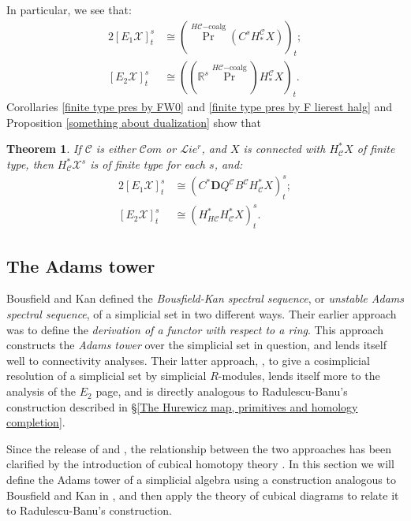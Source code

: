 \documentclass[11pt]{amsart} \renewcommand{\baselinestretch}{1.4}
\theoremstyle{plain}
\newtheorem{thm}{Theorem}[section]
\theoremstyle{definition}
\DeclareMathOperator{\Prim}{Pr}
\newcommand{\scrL}{\mathscr{L}}
\newcommand{\scrC}{\mathscr{C}}
\newcommand{\calx}{\mathcal{X}}
\newcommand{\calc}{\mathcal{C}}
\newcommand{\HA}[1]{H#1}
\newcommand{\HC}[1]{H#1\mathrm{-coalg}}
\newcommand{\algs}{{\scrC\!\textit{om}}}
\newcommand{\restliealgs}{{\scrL\!\textit{ie}^\textit{r}}}
\newcommand{\algcat}{{\calc}}%
\newcommand{\Edownup}[5]{[E_{#1}^{#2}#3]^{#4}_{#5}}
\newcommand{\dual}{\mathbf{D}}
\begin{document}
\begin{Bousfield-Kan spectral sequence}
In particular, we see that:
\begin{alignat*}{2}
\Edownup{1}{}{\calx}{s}{t}&\cong (\Prim^{\HC{\calc}}(C^sH_*^{\algcat}X))_{t};\\
\Edownup{2}{}{\calx}{s}{t}&\cong((\mathbb{R}^s\Prim^{\HC{\calc}})H_*^{\algcat}X)_t.
\end{alignat*}
Corollaries \ref{finite type pres by FW0} and \ref{finite type pres by F lierest halg} and Proposition \ref{something about dualization} show that
\begin{thm}
\label{identify E2 with derived Q}
If $\algcat$ is either $\algs$ or $\restliealgs$, and $X$ is connected with $H^*_\calc X$  of finite type, then $H^*_\calc\calx^s$ is of finite type for each $s$, and:
\begin{alignat*}{2}
\Edownup{1}{}{\calx}{s}{t}&\cong (C^*\dual Q^\algcat B^\algcat H^*_{\algcat}X)^{s}_{t};\\
\Edownup{2}{}{\calx}{s}{t}&\cong (H^*_{\HA{\algcat}}H^*_{\algcat}X)^{s}_{t}.
\end{alignat*}
\end{thm}





\subsection{The Adams tower}\label{sec:derWRTab}\label{sec:relnWithRB}
Bousfield and Kan defined the \emph{Bousfield-Kan spectral sequence}, or \emph{unstable Adams spectral sequence}, of a simplicial set in two different ways. Their earlier approach \cite{BK_pairings.pdf} was to define the \emph{derivation of a functor with respect to a ring}. This approach constructs the \emph{Adams tower} over the simplicial set in question, and lends itself well to connectivity analyses. Their latter approach, \cite{BousKanSSeq.pdf}, to give a cosimplicial resolution of a simplicial set by simplicial $R$-modules, lends itself more to the analysis of the $E_2$ page, and is directly analogous to Radulescu-Banu's construction described in \S\ref{The Hurewicz map, primitives and homology completion}.

Since the release of \cite{BK_pairings.pdf} and \cite{BousKanSSeq.pdf}, the relationship between the two approaches has been clarified by the introduction of cubical homotopy theory \cite{GoodwillieCalcII}. In this section we will define the Adams tower of a simplicial algebra using a construction analogous to Bousfield and Kan in \cite{BK_pairings.pdf}, and then apply the theory of cubical diagrams to relate it to Radulescu-Banu's construction. 



\end{Bousfield-Kan spectral sequence}
\end{document}
